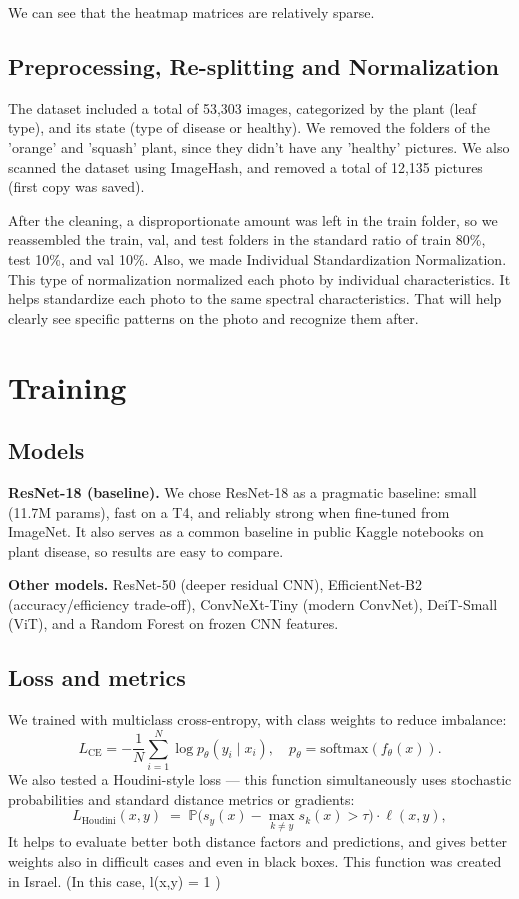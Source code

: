 \documentclass{article}
\begin{document}
We can see that the heatmap matrices are relatively sparse.\\

\subsection{Preprocessing, Re-splitting and Normalization}
The dataset included a total of 53,303 images, categorized by the plant (leaf type), and its state (type of disease or healthy). We removed the folders of the 'orange' and 'squash' plant, since they didn't have any 'healthy' pictures. We also scanned the dataset using ImageHash, and removed a total of 12,135 pictures (first copy was saved).

After the cleaning, a disproportionate amount was left in the train folder, so we reassembled the train, val, and test folders in the standard ratio of train 80\%, test 10\%, and val 10\%. Also, we made Individual Standardization Normalization. This type of normalization normalized each photo by individual characteristics. It helps standardize each photo to the same spectral characteristics. That will help clearly see specific patterns on the photo and recognize them after.

 
\section{Training}
\subsection{Models}
\textbf{ResNet-18 (baseline).} We chose ResNet-18 as a pragmatic baseline: small (11.7M params), fast on a T4, and reliably strong when fine-tuned from ImageNet. It also serves as a common baseline in public Kaggle notebooks on plant disease, so results are easy to compare.

\noindent\textbf{Other models.} ResNet-50 (deeper residual CNN), EfficientNet-B2 (accuracy/efficiency trade-off), ConvNeXt-Tiny (modern ConvNet), DeiT-Small (ViT), and a Random Forest on frozen CNN features.

\subsection{Loss and metrics}
We trained with multiclass cross-entropy, with class weights to reduce imbalance:
\[
L_{\text{CE}} = -\frac{1}{N}\sum_{i=1}^{N}\log p_\theta(y_i\mid x_i), \quad
p_\theta = \text{softmax}(f_\theta(x)).
\]
We also tested a Houdini-style loss — this function simultaneously uses stochastic probabilities and standard distance metrics or gradients:
\[
L_{\text{Houdini}}(x,y) \;=\; \mathbb{P}\big(s_y(x)-\max_{k\neq y}s_k(x) > \tau\big)\cdot \ell(x,y),
\] 
It helps to evaluate better both distance factors and predictions, and gives better weights also in difficult cases and even in black boxes. This function was created in Israel. (In this case, l(x,y) = 1 ) 
\end{document}
